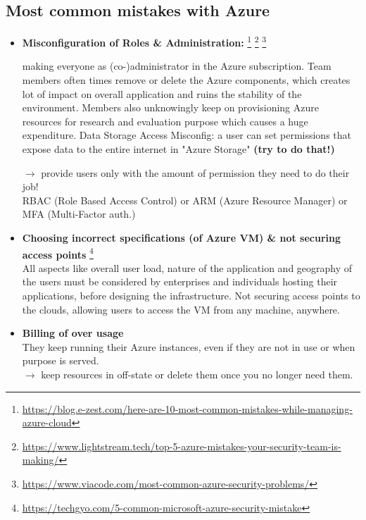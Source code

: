 \documentclass[12pt]{article}
\begin{document}
\newpage
\subsection*{Most common mistakes with Azure}
\begin{itemize}

    \item \textbf{Misconfiguration of Roles \& Administration:} \footnote{\url{https://blog.e-zest.com/here-are-10-most-common-mistakes-while-managing-azure-cloud}} \footnote{\url{https://www.lightstream.tech/top-5-azure-mistakes-your-security-team-is-making/}} \footnote{\url{https://www.viacode.com/most-common-azure-security-problems/}}
    
    making everyone as (co-)administrator in the Azure subscription. Team members often times remove or delete the Azure components, which creates lot of impact on overall application and ruins the stability of the environment. Members also unknowingly keep on provisioning Azure resources for research and evaluation purpose which causes a huge expenditure. Data Storage Access Misconfig: a user can set permissions that expose data to the entire internet in "Azure Storage" \textbf{(try to do that!)} 

    $\rightarrow$ provide users only with the amount of permission they need to do their job! \\
    RBAC (Role Based Access Control) or ARM (Azure Resource Manager) or MFA (Multi-Factor auth.) 


    \item \textbf{Choosing incorrect specifications (of Azure VM) \& not securing access points} \footnotemark[1] \footnote{\url{https://techgyo.com/5-common-microsoft-azure-security-mistake}} \\
    All aspects like overall user load, nature of the application and geography of the users must be considered by enterprises and individuals hosting their applications, before designing the infrastructure.
    Not securing access points to the clouds, allowing users to access the VM from any machine, anywhere.
    
    
    \item \textbf{Billing of over usage} \footnotemark[1] \\
    They keep running their Azure instances, even if they are not in use or when purpose is served. \\
    $\rightarrow$ keep resources in off-state or delete them once you no longer need them.
    

\end{itemize}
\end{document}
